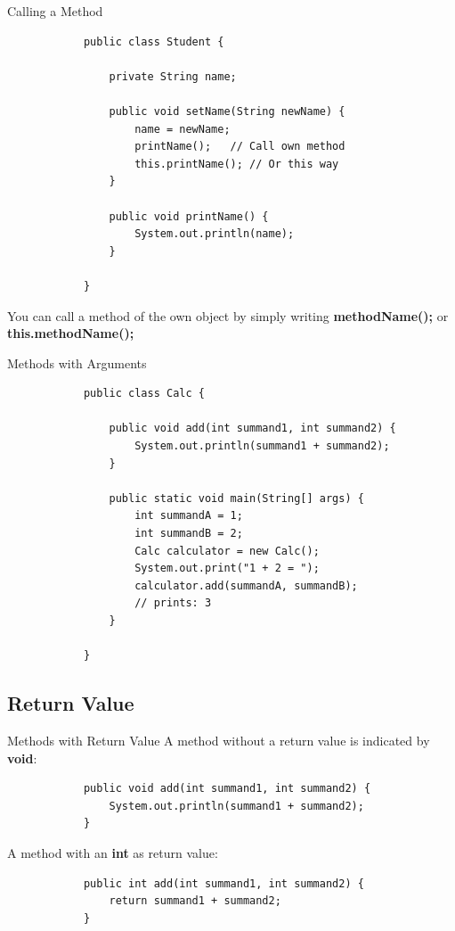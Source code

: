 	\begin{frame}[fragile]{Calling a Method}
		\begin{lstlisting}
			public class Student {
				
				private String name;
				
				public void setName(String newName) {
					name = newName;
					printName();   // Call own method
					this.printName(); // Or this way
				}
				
				public void printName() {
					System.out.println(name);
				}
				
			}
		\end{lstlisting}
		You can call a method of the own object by simply writing \textbf{methodName();} or \textbf{this.methodName();}
	\end{frame}
	
	\begin{frame}[fragile]{Methods with Arguments}
		
		\begin{lstlisting}
			public class Calc {
				
				public void add(int summand1, int summand2) {
					System.out.println(summand1 + summand2);
				}
				
				public static void main(String[] args) {
					int summandA = 1;
					int summandB = 2;
					Calc calculator = new Calc();
					System.out.print("1 + 2 = ");
					calculator.add(summandA, summandB); 
					// prints: 3
				}
				
			}
		\end{lstlisting}
	\end{frame}
	
	\subsection{Return Value}
	\begin{frame}[fragile]{Methods with Return Value}
		A method without a return value is indicated by \textbf{void}:
		\begin{lstlisting}
			public void add(int summand1, int summand2) {
				System.out.println(summand1 + summand2);
			}
		\end{lstlisting}
		A method with an \textbf{int} as return value:
		\begin{lstlisting}
			public int add(int summand1, int summand2) {
				return summand1 + summand2;
			}
		\end{lstlisting}
	\end{frame}
	
